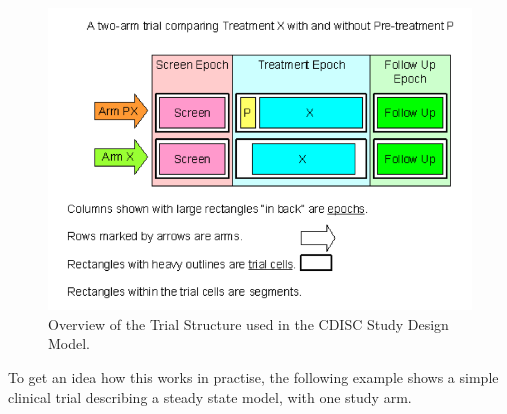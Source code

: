 \documentclass[a4paper,10pt]{article}
\begin{document}
\begin{figure}[htb]
\centering
\includegraphics[height=0.35\textheight,clip=true,trim=0 0.5cm 0 0]{./CDISCTrialStructure}%
\caption{Overview of the Trial Structure used in the CDISC Study
  Design Model.}
\label{fig:cdiscstruct}
\end{figure}


To get an idea how this works in practise, the following example shows
a simple clinical trial describing a steady state model, with one
study arm.
\end{document}
